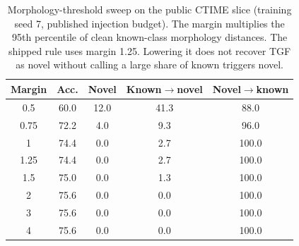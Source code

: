 \begin{table}[t]
\caption{Morphology-threshold sweep on the public CTIME slice (training seed 7, published injection budget). The margin multiplies the 95th percentile of clean known-class morphology distances. The shipped rule uses margin 1.25. Lowering it does not recover TGF as novel without calling a large share of known triggers novel.}
\label{tab:sweep}
\centering
\small
\begin{tabular}{ccccc}
\toprule
Margin & Acc. & Novel & Known$\to$novel & Novel$\to$known \\
\midrule
0.5 & 60.0 & 12.0 & 41.3 & 88.0 \\
0.75 & 72.2 & 4.0 & 9.3 & 96.0 \\
1 & 74.4 & 0.0 & 2.7 & 100.0 \\
1.25 & 74.4 & 0.0 & 2.7 & 100.0 \\
1.5 & 75.0 & 0.0 & 1.3 & 100.0 \\
2 & 75.6 & 0.0 & 0.0 & 100.0 \\
3 & 75.6 & 0.0 & 0.0 & 100.0 \\
4 & 75.6 & 0.0 & 0.0 & 100.0 \\
\bottomrule
\end{tabular}
\end{table}

